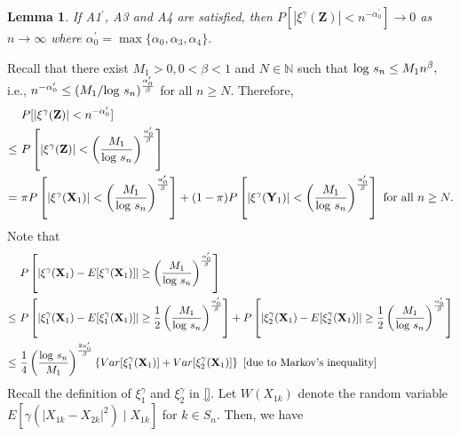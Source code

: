 \documentclass[twoside]{article}
\def\log{\hbox{log}}
\newcommand{\bX}{\mathbf{X}}
\newcommand{\bY}{\mathbf{Y}}
\newcommand{\bZ}{\mathbf{Z}}
\newcommand{\0}{\mathbf{0}}
\newcommand{\1}{\mathbf{1}}
\numberwithin{equation}{section}
\newtheorem{lemma}[thm]{Lemma}
\begin{document}
\begin{lemma}\label{P0_conv}
If A1$^\prime$, A3 and A4 are satisfied, then $P[|\xi^\gamma(\bZ)|<n^{-\alpha^\prime_0}]\to 0$ as $n\to\infty$ where $\alpha^\prime_0=\max\{\alpha_0,\alpha_3,\alpha_4\}.$
\end{lemma}
Recall that there exist $M_1>0,0<\beta<1$ and $N\in\mathbb{N}$ such that $\log\ s_n\leq M_1n^\beta,$ i.e., $n^{-\alpha^\prime_0}\leq (M_1/\log\ s_n)^\frac{\alpha^\prime_0}{\beta}$ for all $n\geq N.$ Therefore,
\begin{align*}
    & \ P[|\xi^\gamma(\bZ)|<n^{-\alpha^\prime_0}]\\
    \leq &\ P\left [|\xi^\gamma(\bZ)|<\left (\frac{M_1}{\log\ s_n}\right )^\frac{\alpha^\prime_0}{\beta}\right ]\\
    =&\ \pi P\left [|\xi^\gamma(\bX_1)|<\left (\frac{M_1}{\log\ s_n}\right )^\frac{\alpha^\prime_0}{\beta}\right ] + (1-\pi)P\left [|\xi^\gamma(\bY_1)|<\left (\frac{M_1}{\log\ s_n}\right )^\frac{\alpha^\prime_0}{\beta}\right ]\text{ for all }n\geq N.
\end{align*}
Note that
\begin{align}\label{P0_1}
    &\ P\left [|\xi^\gamma(\bX_1)-E[\xi^\gamma(\bX_1)]|\geq \left (\frac{M_1}{\log\ s_n}\right )^\frac{\alpha^\prime_0}{\beta}\right ]\nonumber \\
    \leq &\ P\left [|\xi_1^\gamma(\bX_1)-E[\xi_1^\gamma(\bX_1)]|\geq \frac{1}{2}\left (\frac{M_1}{\log\ s_n}\right )^\frac{\alpha^\prime_0}{\beta}\right ]+P\left [|\xi_2^\gamma(\bX_1)-E[\xi_2^\gamma(\bX_1)]|\geq \frac{1}{2}\left (\frac{M_1}{\log\ s_n}\right )^\frac{\alpha^\prime_0}{\beta}\right ]\nonumber \\
    \leq &\ \frac{1}{4}\left (\frac{\log\ s_n}{M_1}\right )^\frac{2\alpha^\prime_0}{\beta}\left \{Var[\xi_1^\gamma(\bX_1)]+Var[\xi_2^\gamma(\bX_1)]\right \}\ [\text{due to Markov's inequality}]
\end{align}
Recall the definition of $\xi_1^\gamma$ and $\xi_2^\gamma$ in \eqref{}. Let $W(X_{1k})$ denote the random variable $E[\gamma(|X_{1k}-X_{2k}|^2)\mid X_{1k}]$ for $k\in S_n.$ Then, we have
\end{document}
